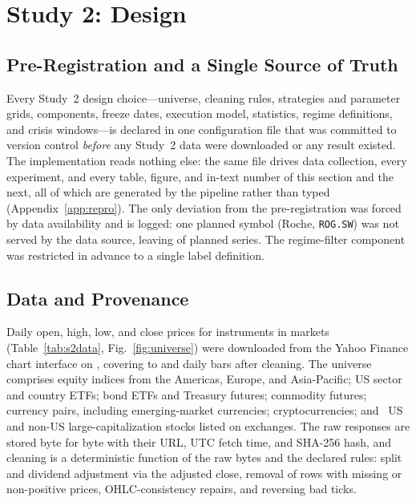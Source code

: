 \section{Study 2: Design}
\label{sec:study2design}

\subsection{Pre-Registration and a Single Source of Truth}

Every Study~2 design choice---universe, cleaning rules, strategies and parameter grids, components, freeze dates,
execution model, statistics, regime definitions, and crisis windows---is declared in one configuration file that was
committed to version control \emph{before} any Study~2 data were downloaded or any result existed. The implementation
reads nothing else: the same file drives data collection, every experiment, and every table, figure, and in-text
number of this section and the next, all of which are generated by the pipeline rather than typed
(Appendix~\ref{app:repro}). The only deviation from the pre-registration was forced by data availability and is
logged: one planned symbol (Roche, \texttt{ROG.SW}) was not served by the data source, leaving \STwoInstruments{} of
\STwoPlanned{} planned series. The regime-filter component was restricted in advance to a single label definition.

\subsection{Data and Provenance}

Daily open, high, low, and close prices for \STwoInstruments{} instruments in \STwoMarkets{} markets
(Table~\ref{tab:s2data}, Fig.~\ref{fig:universe}) were downloaded from the Yahoo Finance chart interface on
\STwoFetched{}, covering \STwoFirst{} to \STwoLast{} and \STwoRows{} daily bars after cleaning. The universe comprises
\STwoNequityindices{} equity indices from the Americas, Europe, and Asia-Pacific; \STwoNequityetfs{} US sector and
country ETFs; \STwoNfixedincome{} bond ETFs and Treasury futures; \STwoNcommodities{} commodity futures;
\STwoNfx{} currency pairs, including emerging-market currencies; \STwoNcrypto{} cryptocurrencies; and
\STwoNstocksus{}~US and \STwoNstocksintl{} non-US large-capitalization stocks listed on \STwoExchanges{} exchanges.
The raw responses are stored byte for byte with their URL, UTC fetch time, and SHA-256 hash, and cleaning is a
deterministic function of the raw bytes and the declared rules: split and dividend adjustment via the adjusted close,
removal of \STwoDropped{} rows with missing or non-positive prices, \STwoRepaired{} OHLC-consistency repairs, and
\STwoBadTicks{} reversing bad ticks.

